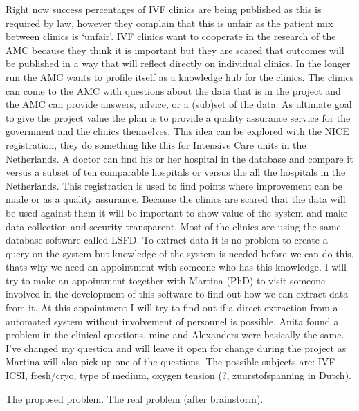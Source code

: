 



Right now success percentages of IVF clinics are being published as this is required by law, however they complain that this is unfair as the patient mix between clinics is ‘unfair’. 
IVF clinics want to cooperate in the research of the AMC because they think it is important but they are scared that outcomes will be published in a way that will reflect directly on individual clinics.
In the longer run the AMC wants to profile itself as a knowledge hub for the clinics. The clinics can come to the AMC with questions about the data that is in the project and the AMC can provide answers, advice, or a (sub)set of the data.
As ultimate goal to give the project value the plan is to provide a quality assurance service for the government and the clinics themselves.
This idea can be explored with the NICE registration, they do something like this for Intensive Care units in the Netherlands. 
A doctor can find his or her hospital in the database and compare it versus a subset of ten comparable hospitals or versus the all the hospitals in the Netherlands. 
This registration is used to find points where improvement can be made or as a quality assurance.
Because the clinics are scared that the data will be used against them it will be important to show value of the system and make data collection and security transparent.
Most of the clinics are using the same database software called LSFD. 
To extract data it is no problem to create a query on the system but knowledge of the system is needed before we can do this, thats why we need an appointment with someone who has this knowledge. 
I will try to make an appointment together with Martina (PhD) to visit someone involved in the development of this software to find out how we can extract data from it. 
At this appointment I will try to find out if a direct extraction from a automated system without involvement of personnel is possible.
Anita found a problem in the clinical questions, mine and Alexanders were basically the same. 
I’ve changed my question and will leave it open for change during the project as Martina will also pick up one of the questions. 
The possible subjects are: IVF ICSI, fresh/cryo, type of medium, oxygen tension (?, zuurstofspanning in Dutch).

The proposed problem.
The real problem (after brainstorm).

